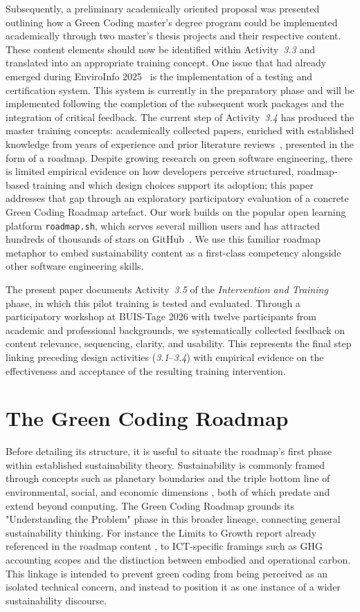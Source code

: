 \documentclass[english]{lni}
\begin{document}
Subsequently, a preliminary academically oriented proposal was presented outlining how a Green Coding master's degree program could be implemented academically through two master's thesis projects and their respective content. These content elements should now be identified within Activity~\emph{3.3} and translated into an appropriate training concept.
One issue that had already emerged during EnviroInfo 2025~\cite{enviroInfo25} is the implementation of a testing and certification system. This system is currently in the preparatory phase and will be implemented following the completion of the subsequent work packages and the integration of critical feedback.
The current step of Activity~\emph{3.4} has produced the master training concepts: academically collected papers, enriched with established knowledge from years of experience and prior literature reviews~\cite{junger23_litrep}, presented in the form of a roadmap. Despite growing research on green software engineering, there is limited empirical evidence on how developers perceive structured, roadmap-based training and which design choices support its adoption; this paper addresses that gap through an exploratory participatory evaluation of a concrete Green Coding Roadmap artefact.
Our work builds on the popular open learning platform \texttt{roadmap.sh}, which serves several million users and has attracted hundreds of thousands of stars on GitHub~\cite{roadmap}. We use this familiar roadmap metaphor to embed sustainability content as a first-class competency alongside other software engineering skills.

The present paper documents Activity~\emph{3.5} of the \emph{Intervention and Training} phase, in which this pilot training is tested and evaluated. Through a participatory workshop at BUIS-Tage 2026 with twelve participants from academic and professional backgrounds, we systematically collected feedback on content relevance, sequencing, clarity, and usability. This represents the final step linking preceding design activities (\emph{3.1}--\emph{3.4}) with empirical evidence on the effectiveness and acceptance of the resulting training intervention.


\section{The Green Coding Roadmap}
Before detailing its structure, it is useful to situate the roadmap's first phase within established sustainability theory. Sustainability is commonly framed through concepts such as planetary boundaries \cite{rockstrom2009safe} and the triple bottom line of environmental, social, and economic dimensions \cite{elkington1999cannibals}, both of which predate and extend beyond computing. The Green Coding Roadmap grounds its "Understanding the Problem" phase in this broader lineage, connecting general sustainability thinking. For instance the Limits to Growth report already referenced in the roadmap content \citep{Me72}, to ICT-specific framings such as GHG accounting scopes and the distinction between embodied and operational carbon. This linkage is intended to prevent green coding from being perceived as an isolated technical concern, and instead to position it as one instance of a wider sustainability discourse.
\end{document}

